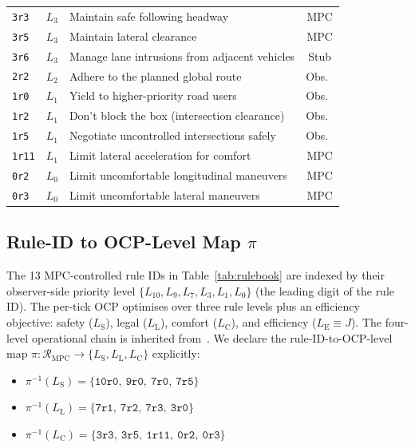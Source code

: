 \begin{table}[t]
\begin{tabularx}{\linewidth}{@{}l l X c@{}}
        \texttt{3r3}  & $L_{3}$  & Maintain safe following headway & MPC \\
        \texttt{3r5}  & $L_{3}$  & Maintain lateral clearance & MPC \\
        \texttt{3r6}  & $L_{3}$  & Manage lane intrusions from adjacent vehicles & Stub \\
        \midrule
        \texttt{2r2}  & $L_{2}$  & Adhere to the planned global route & Obs.\ \\
        \midrule
        \texttt{1r0}  & $L_{1}$  & Yield to higher-priority road users & Obs.\ \\
        \texttt{1r2}  & $L_{1}$  & Don't block the box (intersection clearance) & Obs.\ \\
        \texttt{1r5}  & $L_{1}$  & Negotiate uncontrolled intersections safely & Obs.\ \\
        \texttt{1r11} & $L_{1}$  & Limit lateral acceleration for comfort & MPC \\
        \midrule
        \texttt{0r2}  & $L_{0}$  & Limit uncomfortable longitudinal maneuvers & MPC \\
        \texttt{0r3}  & $L_{0}$  & Limit uncomfortable lateral maneuvers & MPC \\
        \bottomrule
    \end{tabularx}
\end{table}

\subsection{Rule-ID to OCP-Level Map $\pi$}
\label{sec:rulebook:pi-map}

The 13 MPC-controlled rule IDs in Table~\ref{tab:rulebook} are indexed by their observer-side priority level $\{L_{10}, L_9, L_7, L_3, L_1, L_0\}$ (the leading digit of the rule ID). The per-tick OCP optimises over three rule levels plus an efficiency objective: safety ($L_{\mathrm{S}}$), legal ($L_{\mathrm{L}}$), comfort ($L_{\mathrm{C}}$), and efficiency ($L_{\mathrm{E}} \equiv J$). The four-level operational chain is inherited from~\cite[\S 12.1]{lcp2025}. We declare the rule-ID-to-OCP-level map $\pi : \mathcal{R}_{\mathrm{MPC}} \to \{L_{\mathrm{S}}, L_{\mathrm{L}}, L_{\mathrm{C}}\}$ explicitly:

\begin{itemize}[leftmargin=*,noitemsep]
    \item $\pi^{-1}(L_{\mathrm{S}}) = \{\texttt{10r0},\ \texttt{9r0},\ \texttt{7r0},\ \texttt{7r5}\}$
    \item $\pi^{-1}(L_{\mathrm{L}}) = \{\texttt{7r1},\ \texttt{7r2},\ \texttt{7r3},\ \texttt{3r0}\}$
    \item $\pi^{-1}(L_{\mathrm{C}}) = \{\texttt{3r3},\ \texttt{3r5},\ \texttt{1r11},\ \texttt{0r2},\ \texttt{0r3}\}$
\end{itemize}

